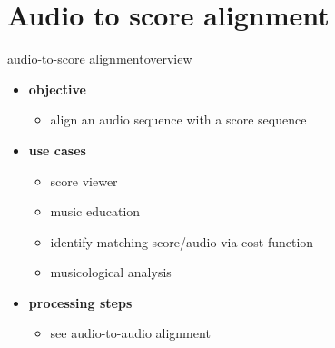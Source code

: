     \section[A2S]{Audio to score alignment}
        \begin{frame}{audio-to-score alignment}{overview}
            \begin{itemize}
                \item   \textbf{objective}
                    \begin{itemize}
                        \item align an audio sequence with a score sequence
                    \end{itemize}
                \bigskip
                \item<2->   \textbf{use cases}
                    \begin{itemize}
                        \item   score viewer
                        \item   music education
                        \item   identify matching score/audio via cost function
                        \item   musicological analysis
                    \end{itemize}
                \bigskip
                \item<3->   \textbf{processing steps}
                    \begin{itemize}
                        \item   see audio-to-audio alignment
                    \end{itemize}
            \end{itemize}
        \end{frame}
